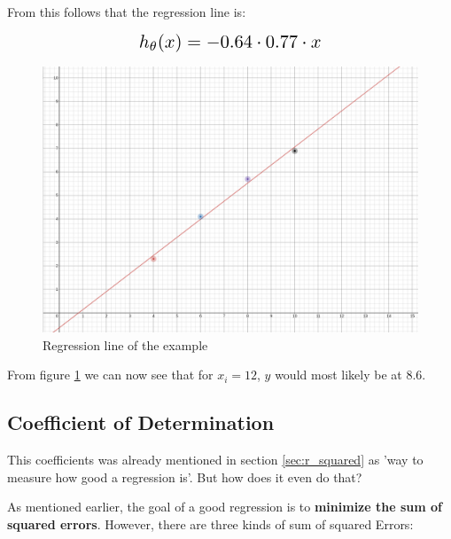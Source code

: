 \documentclass[a4paper, 11pt]{article}
\begin{document}
From this follows that the regression line is:

\[\scalebox{1.5}{
        $h_{\theta}(x) = -0.64 \cdot 0.77 \cdot x$
}\]

\begin{figure}[htb!]
    \centering
    \includegraphics[keepaspectratio=true, width=\linewidth]{regression_line.png}
    \caption{Regression line of the example}
    \label{fig:regression_line}
\end{figure}

From figure \ref{fig:regression_line} we can now see that for $x_{i}=12$, $y$ would most likely be at $8.6$.

\subsection{Coefficient of Determination}

This coefficients was already mentioned in section \ref{sec:r_squared} as 'way to measure how good a regression is'. But how does it even do that?

As mentioned earlier, the goal of a good regression is to \textbf{minimize the sum of squared errors}. However, there are three kinds of sum of squared Errors:

\vspace{10px}
\end{document}
